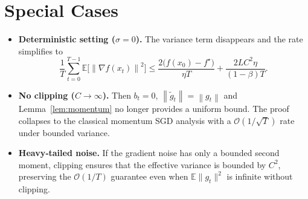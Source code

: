 \documentclass{article}
\newcommand{\E}{\mathbb{E}}
\newcommand{\norm}[1]{\left\lVert #1 \right\rVert}
\begin{document}
\section*{Special Cases}
\begin{itemize}
\item \textbf{Deterministic setting ($\sigma=0$).} The variance term disappears and the rate simplifies to
\[
\frac{1}{T}\sum_{t=0}^{T-1}\E\!\big[\norm{\nabla f(x_t)}^{2}\big]
\le \frac{2\big(f(x_0)-f^\star\big)}{\eta T}
   +\frac{2L C^{2}\eta}{(1-\beta)T}.
\]
\item \textbf{No clipping ($C\to\infty$).} Then $b_t=0$, $\norm{\tilde g_t}=\norm{g_t}$ and Lemma~\ref{lem:momentum} no longer provides a uniform bound. The proof collapses to the classical momentum SGD analysis with a $\mathcal{O}(1/\sqrt{T})$ rate under bounded variance.
\item \textbf{Heavy‑tailed noise.} If the gradient noise has only a bounded second moment, clipping ensures that the effective variance is bounded by $C^{2}$, preserving the $\mathcal{O}(1/T)$ guarantee even when $\E\|g_t\|^{2}$ is infinite without clipping.
\end{itemize}
\end{document}
